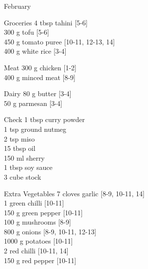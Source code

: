\begin{menu}{February}
\begin{shoppinglist}{Groceries}
      4 tbsp tahini {\scriptsize[5-6]}\\
      300 g tofu {\scriptsize[5-6]}\\
      450 g tomato puree {\scriptsize[10-11, 12-13, 14]}\\
      400 g white rice {\scriptsize[3-4]}\\
      \end{shoppinglist}%
      \par\vfil %
      \begin{shoppinglist}{Meat}
      300 g chicken {\scriptsize[1-2]}\\
      400 g minced meat {\scriptsize[8-9]}\\
      \end{shoppinglist}%
      \begin{shoppinglist}{Dairy}
      80 g butter {\scriptsize[3-4]}\\
      50 g parmesan {\scriptsize[3-4]}\\
      \end{shoppinglist}%
      \par\vfil %
      \vfil\clearpage %
      \begin{shoppinglist}{Check}
      1 tbsp curry powder \\
      1 tsp ground nutmeg \\
      2 tsp miso \\
      15 tbsp oil \\
      150 ml sherry \\
      1 tbsp soy sauce \\
      3 cube stock \\
      \end{shoppinglist}%
      \begin{shoppinglist}{Extra Vegetables}
      7 cloves garlic {\scriptsize[8-9, 10-11, 14]}\\
      1  green chilli {\scriptsize[10-11]}\\
      150 g green pepper {\scriptsize[10-11]}\\
      100 g mushrooms {\scriptsize[8-9]}\\
      800 g onions {\scriptsize[8-9, 10-11, 12-13]}\\
      1000 g potatoes {\scriptsize[10-11]}\\
      2  red chilli {\scriptsize[10-11, 14]}\\
      150 g red pepper {\scriptsize[10-11]}\\
      \end{shoppinglist}%
      \par\vfil %
    \vfil\clearpage
  

\end{menu}
